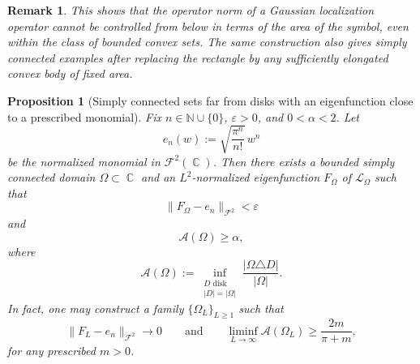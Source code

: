 \documentclass[a4paper,11pt,reqno]{amsart}
\newtheorem{proposition}{Proposition}[section]
\newtheorem{remark}{Remark}[section]
\DeclareMathOperator{\C}{\mathbb{C}}
\newcommand{\N}{\mathbb{N}}
\begin{document}
\begin{remark}
This shows that the operator norm of a Gaussian localization operator cannot be
controlled from below in terms of the area of the symbol, even within the class
of bounded convex sets. The same construction also gives simply connected
examples after replacing the rectangle by any sufficiently elongated convex body
of fixed area.
\end{remark}

\begin{proposition}[Simply connected sets far from disks with an eigenfunction close to a prescribed monomial]
Fix \(n\in\N\cup\{0\}\), \(\varepsilon>0\), and \(0<\alpha<2\). Let
\[
e_n(w):=\sqrt{\frac{\pi^n}{n!}}\,w^n
\]
be the normalized monomial in \(\mathcal F^2(\C)\). Then there exists a bounded
simply connected domain \(\Omega\subset\C\) and an \(L^2\)-normalized
eigenfunction \(F_\Omega\) of \(\mathcal L_\Omega\) such that
\[
\|F_\Omega-e_n\|_{\mathcal F^2}<\varepsilon
\]
and
\[
\mathcal A(\Omega)\ge \alpha,
\]
where
\[
\mathcal A(\Omega):=
\inf_{\substack{D\text{ disk}\\ |D|=|\Omega|}}
\frac{|\Omega\triangle D|}{|\Omega|}.
\]
In fact, one may construct a family \(\{\Omega_L\}_{L\ge 1}\) such that
\[
\|F_L-e_n\|_{\mathcal F^2}\to 0
\qquad\text{and}\qquad
\liminf_{L\to\infty}\mathcal A(\Omega_L)\ge \frac{2m}{\pi+m},
\]
for any prescribed \(m>0\).
\end{proposition}
\end{document}
